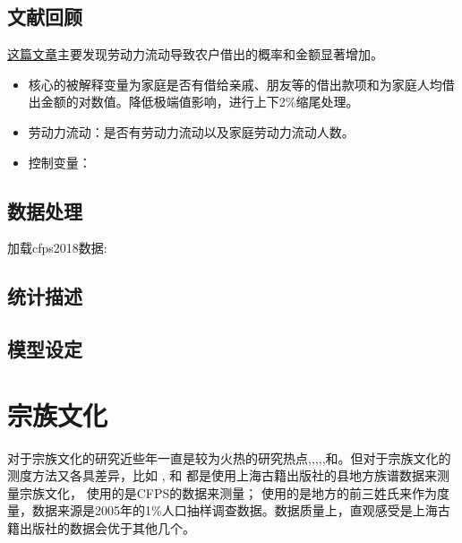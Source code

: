 \documentclass[
  oneside]{book}
\begin{document}
\hypertarget{ux6587ux732eux56deux987e}{%
\section{文献回顾}\label{ux6587ux732eux56deux987e}}

\href{https://www.cnki.com.cn/Article/CJFDTOTAL-SJJJ202112006.htm}{这篇文章}主要发现劳动力流动导致农户借出的概率和金额显著增加。

\begin{itemize}
\item
  核心的被解释变量为家庭是否有借给亲戚、朋友等的借出款项和为家庭人均借出金额的对数值。降低极端值影响，进行上下2\%缩尾处理。
\item
  劳动力流动：是否有劳动力流动以及家庭劳动力流动人数。
\item
  控制变量：
\end{itemize}

\hypertarget{ux6570ux636eux5904ux7406}{%
\section{数据处理}\label{ux6570ux636eux5904ux7406}}

加载cfps2018数据:

\hypertarget{ux7edfux8ba1ux63cfux8ff0}{%
\section{统计描述}\label{ux7edfux8ba1ux63cfux8ff0}}

\hypertarget{ux6a21ux578bux8bbeux5b9a}{%
\section{模型设定}\label{ux6a21ux578bux8bbeux5b9a}}

\hypertarget{culture}{%
\chapter{宗族文化}\label{culture}}

对于宗族文化的研究近些年一直是较为火热的研究热点\autocite{Cao2022},\autocite{Hanetsu2019a},\autocite{ZhangShinYi2021a},\autocite{ChenAkiraKai2018},\autocite{ZhangKawagawa2017},\autocite{ZHANG2020100}和\autocite{FAN2023457}。但对于宗族文化的测度方法又各具差异，比如 \textcite{ZHANG2020100}, \textcite{Cao2022} 和 \textcite{FAN2023457} 都是使用上海古籍出版社的县地方族谱数据来测量宗族文化，\textcite{ZhangKawagawa2017} 使用的是CFPS的数据来测量；\textcite{ZhangShinYi2021a} 使用的是地方的前三姓氏来作为度量，数据来源是2005年的1\%人口抽样调查数据。数据质量上，直观感受是上海古籍出版社的数据会优于其他几个。
\end{document}
